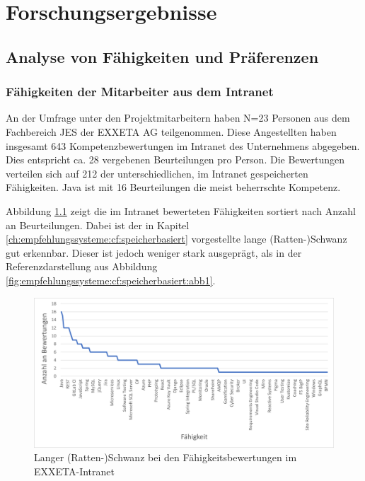 \chapter{Forschungsergebnisse}
\label{ch:ergebnisse}

\section{Analyse von Fähigkeiten und Präferenzen}
\label{ch:ergebnisse:analyse}

\subsection{Fähigkeiten der Mitarbeiter aus dem Intranet}
\label{ch:ergebnisse:analyse:faehigkeiten}
An der Umfrage unter den Projektmitarbeitern haben N=23 Personen aus dem Fachbereich \acl{JES} der EXXETA AG teilgenommen. Diese Angestellten haben insgesamt 643 Kompetenzbewertungen im Intranet des Unternehmens abgegeben. Dies entspricht ca. 28 vergebenen Beurteilungen pro Person. Die Bewertungen verteilen sich auf 212 der \anzFaehigkeiten unterschiedlichen, im Intranet gespeicherten Fähigkeiten. Java ist mit 16 Beurteilungen die meist beherrschte Kompetenz.

Abbildung \ref{fig:ergebnisse:analyse:abb1} zeigt die im Intranet bewerteten Fähigkeiten sortiert nach Anzahl an Beurteilungen. Dabei ist der in Kapitel \ref{ch:empfehlungssysteme:cf:speicherbasiert} vorgestellte lange (Ratten-)Schwanz gut erkennbar. Dieser ist jedoch weniger stark ausgeprägt, als in der Referenzdarstellung aus Abbildung \ref{fig:empfehlungssysteme:cf:speicherbasiert:abb1}.

\begin{figure}[h]
	\centering
	\includegraphics[width=1\textwidth]{gfx/long-tail-intranet.png}
	\caption{Langer (Ratten-)Schwanz bei den Fähigkeitsbewertungen im EXXETA-Intranet}
	\label{fig:ergebnisse:analyse:abb1}
\end{figure}

